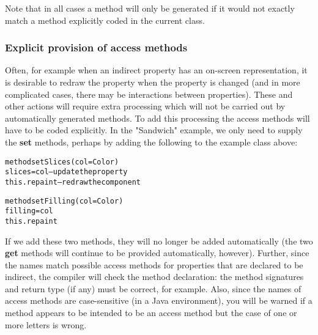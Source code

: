 Note that in all cases a method will only be generated if it would not
exactly
match a method explicitly coded in the current class.
\subsubsection{Explicit provision of access methods}
 
Often, for example when an indirect property has an on-screen
representation, it is desirable to redraw the property when the property
is changed (and in more complicated cases, there may be interactions
between properties).
These and other actions will require extra processing which will not be
carried out by automatically generated methods.  To add this processing
the access methods will have to be coded explicitly.  In the
"Sandwich" example, we only need to supply the \textbf{set}
methods, perhaps by adding the following to the example class above:
\begin{alltt}
method setSlices(col=Color)
  slices=col      -- update the property
  this.repaint    -- redraw the component

method setFilling(col=Color)
  filling=col
  this.repaint
\end{alltt}
If we add these two methods, they will no longer be added
automatically (the two \textbf{get} methods will continue to be
provided automatically, however).  Further, since the names match
possible access methods for properties that are declared to be indirect,
the compiler will check the method declaration: the method signatures
and return type (if any) must be correct, for example.  Also, since the
names of access methods are case-sensitive (in a Java environment), you
will be warned if a method appears to be intended to be an access method
but the case of one or more letters is wrong.
 
